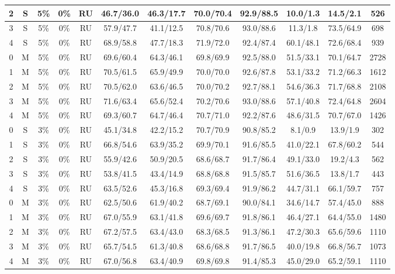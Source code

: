 \begin{table*}
{\begin{tabular}{|c|c|c|c|c||c|c|c|c|c|c||c|}
2 & S & 5\% & 0\% & RU & 46.7/36.0 & 46.3/17.7 & 70.0/70.4 & 92.9/88.5 & 10.0/1.3 & 14.5/2.1 & 526 \\ \hline
3 & S & 5\% & 0\% & RU & 57.9/47.7 & 41.1/12.5 & 70.8/70.6 & 93.0/88.6 & 11.3/1.8 & 73.5/64.9 & 698 \\ \hline
4 & S & 5\% & 0\% & RU & 68.9/58.8 & 47.7/18.3 & 71.9/72.0 & 92.4/87.4 & 60.1/48.1 & 72.6/68.4 & 939 \\ \hline
0 & M & 5\% & 0\% & RU & 69.6/60.4 & 64.3/46.1 & 69.8/69.9 & 92.5/88.0 & 51.5/33.1 & 70.1/64.7 & 2728 \\ \hline
1 & M & 5\% & 0\% & RU & 70.5/61.5 & 65.9/49.9 & 70.0/70.0 & 92.6/87.8 & 53.1/33.2 & 71.2/66.3 & 1612 \\ \hline
2 & M & 5\% & 0\% & RU & 70.5/62.0 & 63.6/46.5 & 70.0/70.2 & 92.7/88.1 & 54.6/36.3 & 71.7/68.8 & 2108 \\ \hline
3 & M & 5\% & 0\% & RU & 71.6/63.4 & 65.6/52.4 & 70.2/70.6 & 93.0/88.6 & 57.1/40.8 & 72.4/64.8 & 2604 \\ \hline
4 & M & 5\% & 0\% & RU & 69.3/60.7 & 64.7/46.4 & 70.7/71.0 & 92.2/87.6 & 48.6/31.5 & 70.7/67.0 & 1426 \\ \hline
0 & S & 3\% & 0\% & RU & 45.1/34.8 & 42.2/15.2 & 70.7/70.9 & 90.8/85.2 & 8.1/0.9 & 13.9/1.9 & 302 \\ \hline
1 & S & 3\% & 0\% & RU & 66.8/54.6 & 63.9/35.2 & 69.9/70.1 & 91.6/85.5 & 41.0/22.1 & 67.8/60.2 & 544 \\ \hline
2 & S & 3\% & 0\% & RU & 55.9/42.6 & 50.9/20.5 & 68.6/68.7 & 91.7/86.4 & 49.1/33.0 & 19.2/4.3 & 562 \\ \hline
3 & S & 3\% & 0\% & RU & 53.8/41.5 & 43.4/14.9 & 68.8/68.8 & 91.5/85.7 & 51.6/36.5 & 13.8/1.7 & 443 \\ \hline
4 & S & 3\% & 0\% & RU & 63.5/52.6 & 45.3/16.8 & 69.3/69.4 & 91.9/86.2 & 44.7/31.1 & 66.1/59.7 & 757 \\ \hline
0 & M & 3\% & 0\% & RU & 62.5/50.6 & 61.9/40.2 & 68.7/69.1 & 90.0/84.1 & 34.6/14.7 & 57.4/45.0 & 888 \\ \hline
1 & M & 3\% & 0\% & RU & 67.0/55.9 & 63.1/41.8 & 69.6/69.7 & 91.8/86.1 & 46.4/27.1 & 64.4/55.0 & 1480 \\ \hline
2 & M & 3\% & 0\% & RU & 67.2/57.5 & 63.4/43.0 & 68.3/68.5 & 91.3/86.1 & 47.2/30.3 & 65.6/59.6 & 1110 \\ \hline
3 & M & 3\% & 0\% & RU & 65.7/54.5 & 61.3/40.8 & 68.6/68.8 & 91.7/86.5 & 40.0/19.8 & 66.8/56.7 & 1073 \\ \hline
4 & M & 3\% & 0\% & RU & 67.0/56.8 & 63.4/40.9 & 69.8/69.8 & 91.4/85.3 & 45.0/29.0 & 65.2/59.1 & 1110 \\ \hline
\end{tabular}}
\end{table*}



